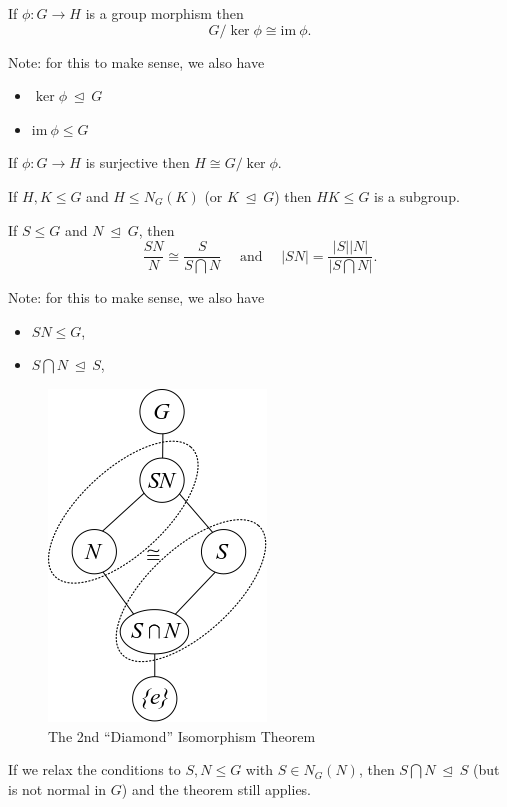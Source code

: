 If \(\phi:G\longrightarrow H\) is a group morphism then
\[G/\ker \phi \cong {\text{im}~}\phi.\]

Note: for this to make sense, we also have

\begin{itemize}
\tightlist
\item
  \(\ker \phi {~\trianglelefteq~}G\)
\item
  \({\text{im}~}\phi \leq G\)
\end{itemize}

If \(\phi: G\longrightarrow H\) is surjective then
\(H\cong G/\ker \phi\).

If \(H,K \leq G\) and \(H \leq N_G(K)\) (or \(K {~\trianglelefteq~}G\))
then \(HK \leq G\) is a subgroup.

If \(S \leq G\) and \(N {~\trianglelefteq~}G\), then \[
\frac{SN}{N} \cong \frac{S}{S\bigcap N} \quad \text{ and }\quad {\left\lvert {SN} \right\rvert} = \frac{{\left\lvert {S} \right\rvert} {\left\lvert {N} \right\rvert}}{{\left\lvert {S\bigcap N} \right\rvert}}
.\]

Note: for this to make sense, we also have

\begin{itemize}
\tightlist
\item
  \(SN \leq G\),
\item
  \(S\bigcap N {~\trianglelefteq~}S\),
\end{itemize}

\begin{figure}
\centering
\includegraphics{figures/2020-01-01-15-20-27.png}
\caption{The 2nd ``Diamond'' Isomorphism Theorem}
\end{figure}

If we relax the conditions to \(S, N \leq G\) with \(S \in N_G(N)\),
then \(S\bigcap N {~\trianglelefteq~}S\) (but is not normal in \(G\))
and the theorem still applies.

